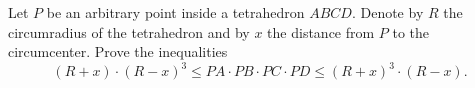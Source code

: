 \problem
Let $P$ be an arbitrary point inside a tetrahedron $ABCD$.
Denote by $R$ the circumradius of the tetrahedron and by $x$ the distance from
$P$ to the circumcenter.
Prove the inequalities
\[
   (R + x) \cdot (R - x)^3
\leq
   PA \cdot PB \cdot PC \cdot PD
\leq
   (R + x)^3 \cdot (R - x)
.\]
\solution
\endproblem
